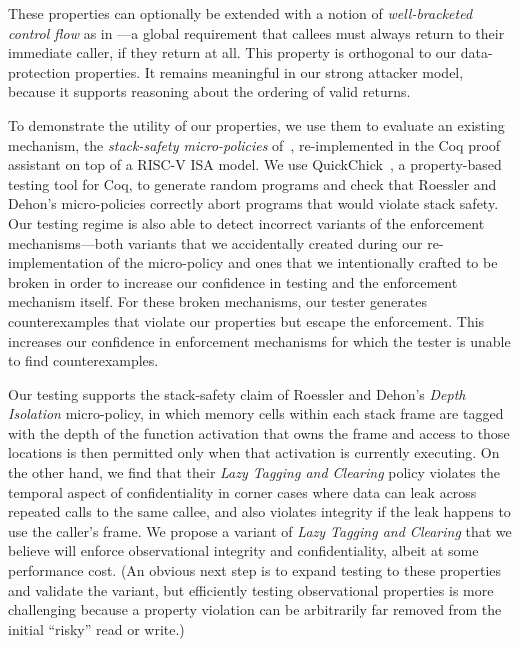 \documentclass[acmtog,review,anonymous]{acmart}\settopmatter{printfolios=true,printccs=false,printacmref=false}
\begin{document}

These properties can optionally be extended with a notion of {\em well-bracketed control flow}
as in \citet{SkorstengaardSTK}---a global requirement that callees
must always return
to their immediate caller, if they return at all. This property is orthogonal to our
data-protection properties. It remains meaningful in our strong attacker model, because
it supports reasoning about the ordering of valid returns.

To demonstrate the utility of our properties, we use them
to evaluate an existing mechanism, the
{\em stack-safety micro-policies} of~\citet{DBLP:conf/sp/RoesslerD18}, re-implemented
in the Coq proof assistant on top of a RISC-V ISA model. We
use QuickChick~\citep{Denes:VSL2014,Pierce:SF4}, a property-based testing
tool for Coq, to generate random programs and check
that Roessler and Dehon's micro-policies correctly abort programs that
would violate stack safety.
Our testing regime is also able to detect incorrect variants of the
enforcement mechanisms---both variants that we accidentally created
during our re-implementation of the micro-policy and ones that we
intentionally crafted to be broken in order to increase our confidence
in testing and the enforcement mechanism itself. For these broken
mechanisms, our tester
generates counterexamples that violate our properties but escape the
enforcement.  This increases our confidence in enforcement
mechanisms for which the tester is unable to find  counterexamples.

Our testing supports the stack-safety claim of Roessler and Dehon's {\em Depth
  Isolation} micro-policy, in
which memory cells within each stack frame are tagged with the depth of
the function activation that owns the frame and access to those locations is
then permitted only when that activation is currently executing.
On the other hand, we find that their \emph{Lazy Tagging and Clearing} policy
violates the temporal aspect of confidentiality in
corner cases where data can leak across repeated calls to the same callee,
and also violates integrity if the leak happens to use the caller's frame. We
propose a variant of {\em Lazy Tagging and Clearing} that
  we believe will enforce observational
integrity and confidentiality, albeit at some performance cost. (An obvious next step
is to expand testing to these properties and validate the variant, but
efficiently
testing observational properties is more challenging because a property
violation can be arbitrarily far removed from the initial ``risky'' read or
write.)
\end{document}
